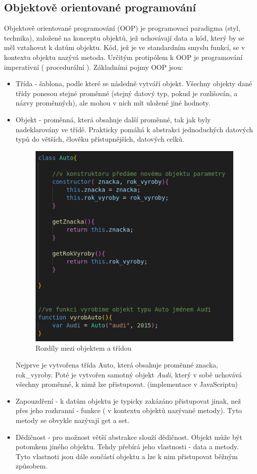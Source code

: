 \documentclass[main.tex]{subfiles}
\begin{document}
\subsection{Objektově orientované programování}
\label{oop}
Objektově orientované programování (OOP) je programovací paradigma (styl, technika), založené na konceptu objektů, jež uchovávají data a kód, který by se měl vztahovat k datům objektu. Kód, jež je ve standardním smyslu funkcí, se v kontextu objektu nazývá metoda. Určitým protipólem k OOP je programování imperativní ( procedurální ). Základními pojmy OOP jsou:
\begin{itemize}
    \item Třída - šablona, podle které se následně vytváří objekt. Všechny objekty dané třídy ponesou stejné proměnné (stejný datový typ, pokud je rozlišován, a názvy proměnných), ale mohou v nich mít uložené jiné hodnoty. 
	\item Objekt - proměnná, která obsahuje další proměnné, tak jak byly nadeklarovány ve třídě. Prakticky pomáhá k abstrakci jednoduchých datových typů do větších, člověku přístupnějších, datových celků.
		\begin{figure}[h]
			\centering
			\includegraphics[width=.6\textwidth]{./images/oop/class_audi.png}
			\caption{Rozdíly mezi objektem a třídou}
		\end{figure}
		Nejprve je vytvořena třída Auto, která obsahuje proměnné znacka, rok\_vyroby. Poté je vytvořen samotný objekt \textit{Audi}, který v sobě uchovává všechny proměnné, k nimž lze přistupovat. (implementace v JavaScriptu)
    \item Zapouzdření - k datům objektu je typicky zakázáno přistupovat jinak, než přes jeho rozhranní - funkce ( v kontextu objektů nazývané metody). Tyto metody se obvykle nazývají get a set.
	\item Dědičnost - pro možnost větší abstrakce slouží dědičnost. Objekt může být potomkem jiného objektu. Tehdy přebírá jeho vlastnosti - data a metody. Tyto vlastnoti jsou dále součástí objektu a lze k nim přistupovat běžným způsobem.

\end{itemize}
\end{document}
